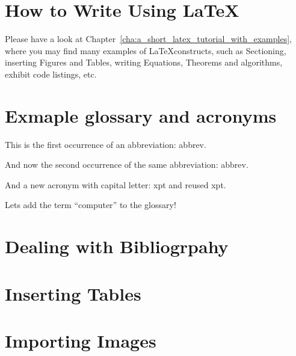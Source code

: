 \section{How to Write Using \LaTeX} %
\label{sec:how_to_write_using_latex}

Please have a look at Chapter~\ref{cha:a_short_latex_tutorial_with_examples}, where you may find many examples of \LaTeX constructs, such as Sectioning, inserting Figures and Tables, writing Equations, Theorems and algorithms, exhibit code listings, etc.




\section{Exmaple glossary and acronyms}
%
%
This is the first occurrence of an abbreviation: \gls{abbrev}.

And now the second occurrence of the same abbreviation: \gls{abbrev}.

And a new acronym with capital letter: \Gls{xpt} and reused \gls{xpt}.

Lets add the term ``\gls{computer}'' to the glossary!
%

\section{Dealing with Bibliogrpahy} %
\label{sec:dealing_with_bibliogrpahy}



\section{Inserting Tables} %
\label{sec:inserting_tables}



\section{Importing Images} %
\label{sec:importing_images}




